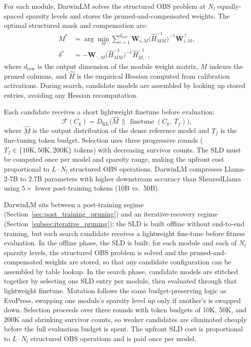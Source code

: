 For each module, DarwinLM solves the structured OBS problem at $N_l$ equally-spaced sparsity levels and stores the pruned-and-compensated weights. The optimal structured mask and compensation are:
\begin{align}
	M^* &= \arg\min_{M}\sum_{i=1}^{d_{\mathrm{row}}}
		\mathbf{W}_{i,M}\bigl(\hat{H}^{-1}_{MM}\bigr)^{-1}\mathbf{W}_{i,M}^\top, \\
	\delta^* &= -\mathbf{W}_{:,M}\bigl(\hat{H}^{-1}_{MM}\bigr)^{-1}\hat{H}^{-1}_{M,:},
\end{align}
where $d_{\mathrm{row}}$ is the output dimension of the module weight matrix, $M$ indexes the pruned columns, and $\hat{H}$ is the empirical Hessian computed from calibration activations. During search, candidate models are assembled by looking up stored entries, avoiding any Hessian recomputation.

Each candidate receives a short lightweight finetune before evaluation:
\begin{equation}
	\mathcal{F}(C_k) = D_{\mathrm{KL}}\!\bigl(\hat{M}\,\|\,\operatorname{finetune}(C_k,\, T_f)\bigr),
\end{equation}
where $\hat{M}$ is the output distribution of the dense reference model and $T_f$ is the fine-tuning token budget. Selection uses three progressive rounds ($T_f \in \{10\text{K}, 50\text{K}, 200\text{K}\}$ tokens) with decreasing survivor counts. The SLD must be computed once per model and sparsity range, making the upfront cost proportional to $L \cdot N_l$ structured OBS operations. DarwinLM compresses Llama-2-7B to 2.7B parameters with higher downstream accuracy than ShearedLlama using $5\times$ fewer post-training tokens (10B vs.\ 50B).

DarwinLM sits between a post-training regime (Section~\ref{sec:post_training_pruning}) and an iterative-recovery regime (Section~\ref{subsec:iterative_pruning}): the SLD is built offline without end-to-end training, but each search candidate receives a lightweight fine-tune before fitness evaluation. In the offline phase, the SLD is built: for each module and each of $N_l$ sparsity levels, the structured OBS problem is solved and the pruned-and-compensated weights are stored, so that any candidate configuration can be assembled by table lookup. In the search phase, candidate models are stitched together by selecting one SLD entry per module, then evaluated through that lightweight finetune. Mutation follows the same budget-preserving logic as EvoPress, swapping one module's sparsity level up only if another's is swapped down. Selection proceeds over three rounds with token budgets of 10K, 50K, and 200K and shrinking survivor counts, so weaker candidates are eliminated cheaply before the full evaluation budget is spent. The upfront SLD cost is proportional to $L \cdot N_l$ structured OBS operations and is paid once per model.


